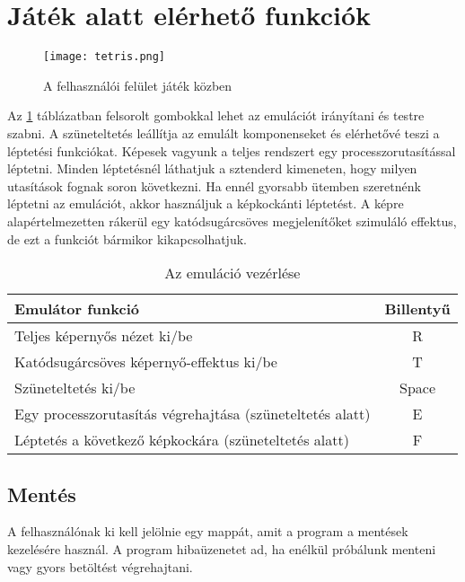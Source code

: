 \section{Játék alatt elérhető funkciók}

\begin{figure}[H]
	\centering
	\texttt{[image: tetris.png]}
	\caption{A felhasználói felület játék közben\protect\footnotemark}
\end{figure}

Az \ref{fig:emucontrol} táblázatban felsorolt gombokkal lehet az emulációt irányítani és testre szabni. A szüneteltetés leállítja az emulált komponenseket és elérhetővé teszi a léptetési funkciókat. Képesek vagyunk a teljes rendszert egy processzorutasítással léptetni. Minden léptetésnél láthatjuk a sztenderd kimeneten, hogy milyen utasítások fognak soron következni. Ha ennél gyorsabb ütemben szeretnénk léptetni az emulációt, akkor használjuk a képkockánti léptetést. A képre alapértelmezetten rákerül egy katódsugárcsöves megjelenítőket szimuláló effektus, de ezt a funkciót bármikor kikapcsolhatjuk.

\begin{table}[H]
	\centering
	\begin{tabular}{ | l | c | }
		\hline
		Emulátor funkció & Billentyű \\
		\hline			
		Teljes képernyős nézet ki/be & R \\
		Katódsugárcsöves képernyő-effektus ki/be & T \\
		Szüneteltetés ki/be & Space \\
		Egy processzorutasítás végrehajtása (szüneteltetés alatt) & E \\
		Léptetés a következő képkockára (szüneteltetés alatt) & F \\
		\hline
	\end{tabular}
	\caption{Az emuláció vezérlése}
	\label{fig:emucontrol}
\end{table}

\subsection{Mentés}

A felhasználónak ki kell jelölnie egy mappát, amit a program a mentések kezelésére használ. A program hibaüzenetet ad, ha enélkül próbálunk menteni vagy gyors betöltést végrehajtani.

